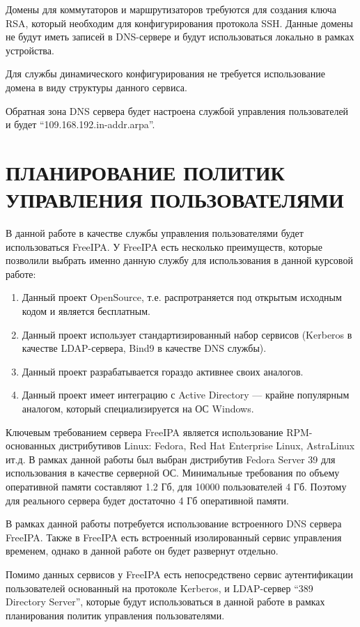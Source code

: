 \documentclass[14pt, a4paper]{extarticle}
\begin{document}
Домены для коммутаторов и маршрутизаторов требуются для создания ключа
RSA\cite{rsa}, который необходим для конфигурирования протокола
SSH. Данные домены не будут иметь записей в DNS-сервере и будут
использоваться локально в рамках устройства.

Для службы динамического конфигурирования не требуется использование
домена в виду структуры данного сервиса.

Обратная зона DNS сервера будет настроена службой управления
пользователей и будет ``109.168.192.in-addr.arpa''.

\section{ПЛАНИРОВАНИЕ ПОЛИТИК УПРАВЛЕНИЯ ПОЛЬЗОВАТЕЛЯМИ}

В данной работе в качестве службы управления пользователями будет
использоваться FreeIPA. У FreeIPA есть несколько преимуществ, которые
позволили выбрать именно данную службу для использования в данной
курсовой работе:
\begin{enumerate}
\item Данный проект OpenSource, т.е. распротраняется под открытым
  исходным кодом и является бесплатным.
\item Данный проект использует стандартизированный набор сервисов
  (Kerberos в качестве LDAP-сервера, Bind9 в качестве DNS службы).
\item Данный проект разрабатывается гораздо активнее своих аналогов.
\item Данный проект имеет интеграцию с Active Directory --- крайне
  популярным аналогом, который специализируется на ОС Windows.
\end{enumerate}

Ключевым требованием сервера FreeIPA является использование
RPM-основанных дистрибутивов Linux: Fedora, Red Hat Enterprise Linux,
AstraLinux и\;т.д. В рамках данной работы был выбран дистрибутив
Fedora Server 39 для использования в качестве серверной
ОС. Минимальные требования по объему оперативной памяти составляют 1.2
Гб, для 10000 пользователей 4 Гб. Поэтому для реального сервера будет
достаточно 4 Гб оперативной памяти.

В рамках данной работы потребуется использование встроенного DNS
сервера FreeIPA. Также в FreeIPA есть встроенный изолированный сервис
управления временем, однако в данной работе он будет развернут
отдельно. 

Помимо данных сервисов у FreeIPA есть непосредствено сервис
аутентификации пользователей основанный на протоколе Kerberos, и
LDAP-сервер ``389 Directory Server'', которые будут использоваться в
данной работе в рамках планирования политик управления пользователями.
\end{document}
